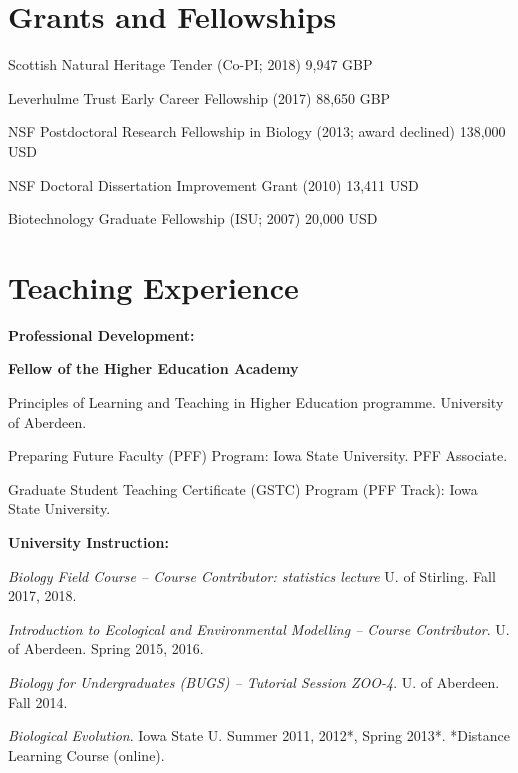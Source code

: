 \documentclass[letterpaper]{article}
\renewenvironment{itemize}{
  \begin{list}{}{
    \setlength{\leftmargin}{1.5em}
  }
}{
  \end{list}
}
\begin{document}
\begin{small}
\section*{Grants and Fellowships}
\begin{itemize}
\item Scottish Natural Heritage Tender (Co-PI; 2018) \hfill 9,947 GBP
\item Leverhulme Trust Early Career Fellowship (2017) \hfill 88,650 GBP
\item NSF Postdoctoral Research Fellowship in Biology (2013; award declined) \hfill 138,000 USD
\item NSF Doctoral Dissertation Improvement Grant (2010) \hfill 13,411 USD
\item Biotechnology Graduate Fellowship (ISU; 2007) \hfill 20,000 USD 
\end{itemize}


\section*{Teaching Experience}


\begin{itemize}
\item {\bf Professional Development:}
\begin{itemize}
\item[$\bullet$]{{\bf Fellow of the Higher Education Academy}}
\item[$\bullet$]{Principles of Learning and Teaching in Higher Education programme. University of Aberdeen.}
\item[$\bullet$]{Preparing Future Faculty (PFF) Program: Iowa State University. PFF Associate.}
\item[$\bullet$]{Graduate Student Teaching Certificate (GSTC) Program (PFF Track): Iowa State University.}
\end{itemize}

\item {\bf University Instruction:}
\begin{itemize}
\item[$\bullet$]{{\it Biology Field Course -- Course Contributor: statistics lecture} U. of Stirling. Fall 2017, 2018.}
\item[$\bullet$]{{\it Introduction to Ecological and Environmental Modelling -- Course Contributor}. U. of Aberdeen. Spring 2015, 2016.}
\item[$\bullet$]{{\it Biology for Undergraduates (BUGS) -- Tutorial Session ZOO-4}. U. of Aberdeen. Fall 2014.}
\item[$\bullet$]{{\it Biological Evolution}. Iowa State U. Summer 2011, 2012*, Spring 2013*. *Distance Learning Course (online).}
\end{itemize}


\end{itemize}
\end{small}
\end{document}
